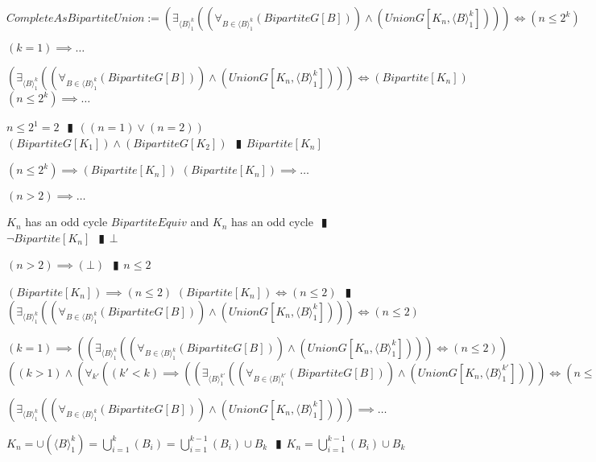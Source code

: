 \documentclass{book}
\newcommand{\abr}{:=}
\newcommand{\pipe}{$\phantom{(}\vrectangleblack\phantom{)}$}
\newcommand{\pr}[1]{\left(#1\right)}
\begin{document}
$CompleteAsBipartiteUnion \abr \pr{\exists_{\langle B \rangle_1^k}\pr{\pr{\forall_{B \in \langle B \rangle_1^k}(BipartiteG[B])} \land (UnionG[K_n, \langle B \rangle_1^k])}} \iff (n \leq 2^k)$
\begin{enumerate}
  \lit $(k = 1) \implies \ldots$
  \begin{enumerate}
    \lit $\pr{\exists_{\langle B \rangle_1^k}\pr{\pr{\forall_{B \in \langle B \rangle_1^k}(BipartiteG[B])} \land (UnionG[K_n, \langle B \rangle_1^k])}} \iff (Bipartite[K_n])$
    \lit $(n \leq 2^k) \implies \ldots$
    \begin{enumerate}
      \lit $n \leq 2^1 = 2$ \pipe $\pr{(n = 1) \lor (n = 2)}$
      \lit $(BipartiteG[K_1]) \land (BipartiteG[K_2])$ \pipe $Bipartite[K_n]$
    \end{enumerate}
    \lit $(n \leq 2^k) \implies (Bipartite[K_n])$
    \lit $(Bipartite[K_n]) \implies \ldots$
    \begin{enumerate}
      \lit $(n > 2) \implies \ldots$
      \begin{enumerate}
        \lit $K_n$ has an odd cycle
        \lit $BipartiteEquiv$ and $K_n$ has an odd cycle \pipe $\lnot Bipartite[K_n]$ \pipe $\bot$
      \end{enumerate}
      \lit $(n > 2) \implies (\bot)$ \pipe $n \leq 2$
    \end{enumerate}
    \lit $(Bipartite[K_n]) \implies (n \leq 2)$
    \lit $(Bipartite[K_n]) \iff (n \leq 2)$ \pipe $\pr{\exists_{\langle B \rangle_1^k}\pr{\pr{\forall_{B \in \langle B \rangle_1^k}(BipartiteG[B])} \land (UnionG[K_n, \langle B \rangle_1^k])}} \iff (n \leq 2)$
  \end{enumerate}
  \lit $(k = 1) \implies \pr{\pr{\exists_{\langle B \rangle_1^k}\pr{\pr{\forall_{B \in \langle B \rangle_1^k}(BipartiteG[B])} \land (UnionG[K_n, \langle B \rangle_1^k])}} \iff (n \leq 2)}$
  \lit $\pr{(k > 1) \land \pr{\forall_{k'}\pr{(k' < k) \implies \pr{\pr{\exists_{\langle B \rangle_1^{k'}}\pr{\pr{\forall_{B \in \langle B \rangle_1^{k'}}(BipartiteG[B])} \land (UnionG[K_n, \langle B \rangle_1^{k'}])}} \iff (n \leq 2^{k'})}}}} \implies \ldots$
  \begin{enumerate}
    \lit $\pr{\exists_{\langle B \rangle_1^k}\pr{\pr{\forall_{B \in \langle B \rangle_1^k}(BipartiteG[B])} \land (UnionG[K_n, \langle B \rangle_1^k])}} \implies \ldots$
    \begin{enumerate}
      \lit $K_n = \cup(\langle B \rangle_1^k) = \bigcup \limits_{i=1}^{k}(B_i) = \bigcup \limits_{i=1}^{k - 1}(B_i) \cup B_k$ \pipe $K_n = \bigcup \limits_{i=1}^{k - 1}(B_i) \cup B_k$

\end{enumerate}
\end{enumerate}
\end{enumerate}
\end{document}
